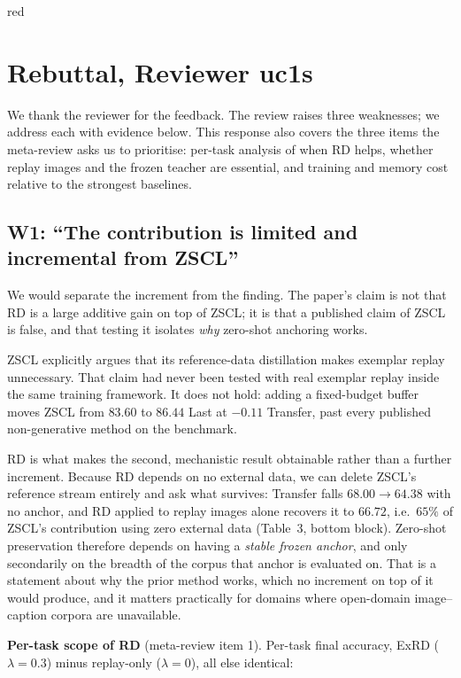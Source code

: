 \documentclass[11pt]{article}
\begin{document}
\begin{color}{red}
\section*{Rebuttal, Reviewer uc1s}

We thank the reviewer for the feedback. The review raises three weaknesses; we address each with evidence below. This response also covers the three items the meta-review asks us to prioritise: per-task analysis of when RD helps, whether replay images and the frozen teacher are essential, and training and memory cost relative to the strongest baselines.

\subsection*{W1: ``The contribution is limited and incremental from ZSCL''}

We would separate the increment from the finding. The paper's claim is not that RD is a large additive gain on top of ZSCL; it is that a published claim of ZSCL is false, and that testing it isolates \emph{why} zero-shot anchoring works.

ZSCL explicitly argues that its reference-data distillation makes exemplar replay unnecessary. That claim had never been tested with real exemplar replay inside the same training framework. It does not hold: adding a fixed-budget buffer moves ZSCL from $83.60$ to $86.44$ Last at $-0.11$ Transfer, past every published non-generative method on the benchmark.

RD is what makes the second, mechanistic result obtainable rather than a further increment. Because RD depends on no external data, we can delete ZSCL's reference stream entirely and ask what survives: Transfer falls $68.00 \to 64.38$ with no anchor, and RD applied to replay images alone recovers it to $66.72$, i.e.\ $65\%$ of ZSCL's contribution using zero external data (Table~3, bottom block). Zero-shot preservation therefore depends on having a \emph{stable frozen anchor}, and only secondarily on the breadth of the corpus that anchor is evaluated on. That is a statement about why the prior method works, which no increment on top of it would produce, and it matters practically for domains where open-domain image--caption corpora are unavailable.

\textbf{Per-task scope of RD} (meta-review item 1). Per-task final accuracy, ExRD ($\lambda{=}0.3$) minus replay-only ($\lambda{=}0$), all else identical:


\end{color}
\end{document}
